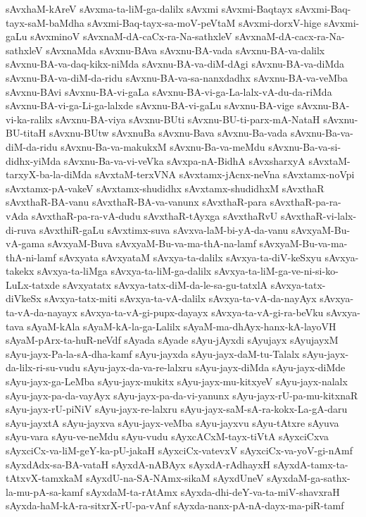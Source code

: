 {sAvxhaM-kAreV
sAvxma-ta-liM-ga-dalilx
sAvxmi
sAvxmi-Baqtayx
sAvxmi-Baq-tayx-saM-baMdha
sAvxmi-Baq-tayx-sa-moV-peVtaM
sAvxmi-dorxV-hige
sAvxmi-gaLu
sAvxminoV
sAvxnaM-dA-caCx-ra-Na-sathxleV
sAvxnaM-dA-cacx-ra-Na-sathxleV
sAvxnaMda
sAvxnu-BAva
sAvxnu-BA-vada
sAvxnu-BA-va-dalilx
sAvxnu-BA-va-daq-kikx-niMda
sAvxnu-BA-va-diM-dAgi
sAvxnu-BA-va-diMda
sAvxnu-BA-va-diM-da-ridu
sAvxnu-BA-va-sa-nanxdadhx
sAvxnu-BA-va-veMba
sAvxnu-BAvi
sAvxnu-BA-vi-gaLa
sAvxnu-BA-vi-ga-La-lalx-vA-du-da-riMda
sAvxnu-BA-vi-ga-Li-ga-lalxde
sAvxnu-BA-vi-gaLu
sAvxnu-BA-vige
sAvxnu-BA-vi-ka-ralilx
sAvxnu-BA-viya
sAvxnu-BUti
sAvxnu-BU-ti-parx-mA-NataH
sAvxnu-BU-titaH
sAvxnu-BUtw
sAvxnuBa
sAvxnu-Bava
sAvxnu-Ba-vada
sAvxnu-Ba-va-diM-da-ridu
sAvxnu-Ba-va-makukxM
sAvxnu-Ba-va-meMdu
sAvxnu-Ba-va-si-didhx-yiMda
sAvxnu-Ba-va-vi-veVka
sAvxpa-nA-BidhA
sAvxsharxyA
sAvxtaM-tarxyX-ba-la-diMda
sAvxtaM-terxVNA
sAvxtamx-jAcnx-neVna
sAvxtamx-noVpi
sAvxtamx-pA-vakeV
sAvxtamx-shudidhx
sAvxtamx-shudidhxM
sAvxthaR
sAvxthaR-BA-vanu
sAvxthaR-BA-va-vanunx
sAvxthaR-para
sAvxthaR-pa-ra-vAda
sAvxthaR-pa-ra-vA-dudu
sAvxthaR-tAyxga
sAvxthaRvU
sAvxthaR-vi-lalx-di-ruva
sAvxthiR-gaLu
sAvxtimx-suva
sAvxva-laM-bi-yA-da-vanu
sAvxyaM-Bu-vA-gama
sAvxyaM-Buva
sAvxyaM-Bu-va-ma-thA-na-lamf
sAvxyaM-Bu-va-ma-thA-ni-lamf
sAvxyata
sAvxyataM
sAvxya-ta-dalilx
sAvxya-ta-diV-keSxyu
sAvxya-takekx
sAvxya-ta-liMga
sAvxya-ta-liM-ga-dalilx
sAvxya-ta-liM-ga-ve-ni-si-ko-LuLx-tatxde
sAvxyatatx
sAvxya-tatx-diM-da-le-sa-gu-tatxlA
sAvxya-tatx-diVkeSx
sAvxya-tatx-miti
sAvxya-ta-vA-dalilx
sAvxya-ta-vA-da-nayAyx
sAvxya-ta-vA-da-nayayx
sAvxya-ta-vA-gi-pupx-dayayx
sAvxya-ta-vA-gi-ra-beVku
sAvxya-tava
sAyaM-kAla
sAyaM-kA-la-ga-Lalilx
sAyaM-ma-dhAyx-hanx-kA-layoVH
sAyaM-pArx-ta-huR-neVdf
sAyada
sAyade
sAyu-jAyxdi
sAyujayx
sAyujayxM
sAyu-jayx-Pa-la-sA-dha-kamf
sAyu-jayxda
sAyu-jayx-daM-tu-Talalx
sAyu-jayx-da-lilx-ri-su-vudu
sAyu-jayx-da-va-re-lalxru
sAyu-jayx-diMda
sAyu-jayx-diMde
sAyu-jayx-ga-LeMba
sAyu-jayx-mukitx
sAyu-jayx-mu-kitxyeV
sAyu-jayx-nalalx
sAyu-jayx-pa-da-vayAyx
sAyu-jayx-pa-da-vi-yanunx
sAyu-jayx-rU-pa-mu-kitxnaR
sAyu-jayx-rU-piNiV
sAyu-jayx-re-lalxru
sAyu-jayx-saM-sA-ra-kokx-La-gA-daru
sAyu-jayxtA
sAyu-jayxva
sAyu-jayx-veMba
sAyu-jayxvu
sAyu-tAtxre
sAyuva
sAyu-vara
sAyu-ve-neMdu
sAyu-vudu
sAyxcACxM-tayx-tiVtA
sAyxciCxva
sAyxciCx-va-liM-geY-ka-pU-jakaH
sAyxciCx-vatevxV
sAyxciCx-va-yoV-gi-nAmf
sAyxdAdx-sa-BA-vataH
sAyxdA-nABAyx
sAyxdA-rAdhayxH
sAyxdA-tamx-ta-tAtxvX-tamxkaM
sAyxdU-na-SA-NAmx-sikaM
sAyxdUneV
sAyxdaM-ga-sathx-la-mu-pA-sa-kamf
sAyxdaM-ta-rAtAmx
sAyxda-dhi-deY-va-ta-miV-shavxraH
sAyxda-haM-kA-ra-sitxrX-rU-pa-vAnf
sAyxda-nanx-pA-nA-dayx-ma-piR-tamf
}

